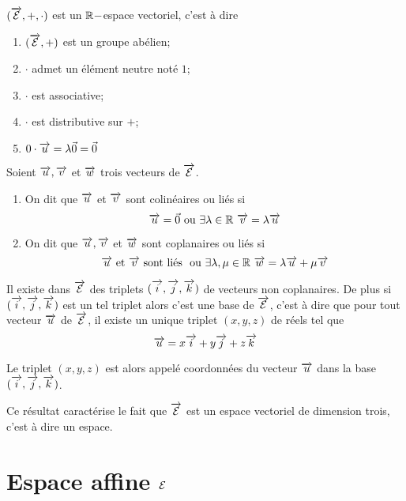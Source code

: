 \begin{prop}
  $(\overrightarrow{\mathcal{E}}, +, \cdot)$ est un $\mathbb{R}-$espace vectoriel, c'est à dire
  \begin{enumerate}
  \item $(\overrightarrow{\mathcal{E}}, +)$ est un groupe abélien;
  \item $\cdot$ admet un élément neutre noté $1$;
  \item $\cdot$ est associative;
  \item $\cdot$ est distributive sur $+$;
  \item $0 \cdot \overrightarrow{u} = \lambda \vec{0} = \vec{0}$
  \end{enumerate}
\end{prop}
\begin{defdef}
  Soient $\overrightarrow{u}, \overrightarrow{v}$ et $\overrightarrow{w}$ trois vecteurs de $\overrightarrow{\mathcal{E}}$.
  \begin{enumerate}
  \item On dit que $\overrightarrow{u}$ et $\overrightarrow{v}$ sont colinéaires ou liés si
    \begin{equation}
      \overrightarrow{u} = \vec{0} \text{ ou } \exists \lambda \in \mathbb{R} \ \overrightarrow{v} = \lambda \overrightarrow{u}
    \end{equation}
  \item On dit que $\overrightarrow{u}, \overrightarrow{v}$ et $\overrightarrow{w}$ sont coplanaires ou liés si
    \begin{equation}
      \overrightarrow{u} \text{ et } \overrightarrow{v} \text{ sont liés } \text{ ou } \exists \lambda, \mu \in \mathbb{R} \ \overrightarrow{w} = \lambda \overrightarrow{u} + \mu \overrightarrow{v}
    \end{equation}
  \end{enumerate}
\end{defdef}
\begin{prop}
  Il existe dans $\overrightarrow{\mathcal{E}}$ des triplets $(\overrightarrow{i},\overrightarrow{j},\overrightarrow{k})$ de vecteurs non coplanaires. De plus si $(\overrightarrow{i},\overrightarrow{j},\overrightarrow{k})$ est un tel triplet alors c'est une base de $\overrightarrow{\mathcal{E}}$, c'est à dire que pour tout vecteur $\overrightarrow{u}$ de $\overrightarrow{\mathcal{E}}$, il existe un unique triplet $(x,y,z)$ de réels tel que
  \begin{equation}
    \overrightarrow{u} = x\overrightarrow{i} + y\overrightarrow{j} + z\overrightarrow{k}
  \end{equation}
\end{prop}
\begin{defdef}
  Le triplet $(x,y,z)$ est alors appelé coordonnées du vecteur $\overrightarrow{u}$ dans la base $(\overrightarrow{i},\overrightarrow{j},\overrightarrow{k})$.
\end{defdef}

Ce résultat caractérise le fait que $\overrightarrow{\mathcal{E}}$ est un espace vectoriel de dimension trois, c'est à dire un espace.

\section{Espace affine $\mathcal{E}$}

